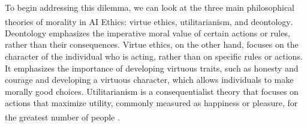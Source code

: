 \documentclass[10pt]{article}
\begin{document}
To begin addressing this dilemma, we can look at the three main philosophical theories of morality in AI Ethics: virtue ethics, utilitarianism, and deontology\textsuperscript{\cite{badea_have_2022}}. Deontology emphasizes the imperative moral value of certain actions or rules, rather than their consequences. Virtue ethics, on the other hand, focuses on the character of the individual who is acting, rather than on specific rules or actions. It emphasizes the importance of developing virtuous traits, such as honesty and courage and developing a virtuous character, which allows individuals to make morally good choices. Utilitarianism is a consequentialist theory that focuses on actions that maximize utility, commonly measured as happiness or pleasure, for the greatest number of people \textsuperscript{\cite{badea_have_2022}}.
\end{document}
